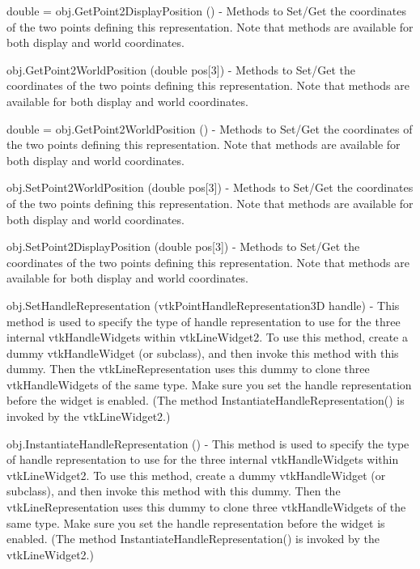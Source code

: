 \begin{DoxyItemize}
\item {\ttfamily double = obj.\-Get\-Point2\-Display\-Position ()} -\/ Methods to Set/\-Get the coordinates of the two points defining this representation. Note that methods are available for both display and world coordinates.  
\item {\ttfamily obj.\-Get\-Point2\-World\-Position (double pos\mbox{[}3\mbox{]})} -\/ Methods to Set/\-Get the coordinates of the two points defining this representation. Note that methods are available for both display and world coordinates.  
\item {\ttfamily double = obj.\-Get\-Point2\-World\-Position ()} -\/ Methods to Set/\-Get the coordinates of the two points defining this representation. Note that methods are available for both display and world coordinates.  
\item {\ttfamily obj.\-Set\-Point2\-World\-Position (double pos\mbox{[}3\mbox{]})} -\/ Methods to Set/\-Get the coordinates of the two points defining this representation. Note that methods are available for both display and world coordinates.  
\item {\ttfamily obj.\-Set\-Point2\-Display\-Position (double pos\mbox{[}3\mbox{]})} -\/ Methods to Set/\-Get the coordinates of the two points defining this representation. Note that methods are available for both display and world coordinates.  
\item {\ttfamily obj.\-Set\-Handle\-Representation (vtk\-Point\-Handle\-Representation3\-D handle)} -\/ This method is used to specify the type of handle representation to use for the three internal vtk\-Handle\-Widgets within vtk\-Line\-Widget2. To use this method, create a dummy vtk\-Handle\-Widget (or subclass), and then invoke this method with this dummy. Then the vtk\-Line\-Representation uses this dummy to clone three vtk\-Handle\-Widgets of the same type. Make sure you set the handle representation before the widget is enabled. (The method Instantiate\-Handle\-Representation() is invoked by the vtk\-Line\-Widget2.)  
\item {\ttfamily obj.\-Instantiate\-Handle\-Representation ()} -\/ This method is used to specify the type of handle representation to use for the three internal vtk\-Handle\-Widgets within vtk\-Line\-Widget2. To use this method, create a dummy vtk\-Handle\-Widget (or subclass), and then invoke this method with this dummy. Then the vtk\-Line\-Representation uses this dummy to clone three vtk\-Handle\-Widgets of the same type. Make sure you set the handle representation before the widget is enabled. (The method Instantiate\-Handle\-Representation() is invoked by the vtk\-Line\-Widget2.)  

\end{DoxyItemize}
